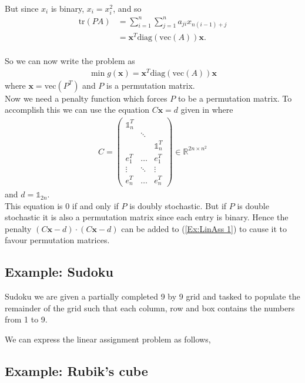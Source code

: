 \documentclass{article}
\begin{document}
But since \(x_i\) is binary, \(x_i = x_i^2\), and so 
\begin{align*}
    \text{tr}(PA) &= \sum_{i=1}^{n} \sum_{j=1}^{n} a_{ji}x_{n(i-1)+j} \\
    &= \mathbf{x}^T \text{diag}(\text{vec}(A))\mathbf{x}.
\end{align*}\\
\noindent So we can now write the problem as 
\begin{align} \label{Ex:LinAss 1}
    \min g(\mathbf{x}) = \mathbf{x}^T \text{diag}(\text{vec}(A)) \mathbf{x}
\end{align}
where \(\mathbf{x} = \text{vec}(P^T)\) and \(P\) is a permutation matrix.\\

\noindent Now we need a penalty function which forces \(P\) to be a permutation matrix. To accomplish this we can use the equation \(C\mathbf{x} = d\) given in \cite[p.~8]{klus2023continuous} where 
\begin{align*}
    C = \begin{pmatrix}
        \mathbb{1}_n^T & & \\
         & \ddots & \\ 
         & & \mathbb{1}_n^T \\
         e_1^T & \hdots & e_1^T \\
         \vdots & \ddots & \vdots \\
         e_n^T & \hdots & e_n^T
    \end{pmatrix} \in \mathbb{R}^{2n \times n^2}
\end{align*}
and \(d = \mathbb{1}_{2n}\). \\
This equation is 0 if and only if \(P\) is doubly stochastic. But if \(P\) is double stochastic it is also a permutation matrix since each entry is binary. Hence the penalty \((C\mathbf{x} - d) \cdot (C\mathbf{x} - d)\) can be added to (\ref{Ex:LinAss 1}) to cause it to favour permutation matrices.

\subsection{Example: Sudoku}

Sudoku we are given a partially completed 9 by 9 grid and tasked to populate the remainder of the grid such that each column, row and box contains the numbers from 1 to 9.

We can express the linear assignment problem as follows,

\subsection{Example: Rubik's cube}
\end{document}
